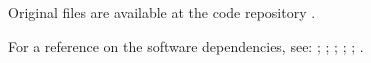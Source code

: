 
Original files are available at
the code repository \parencite{OwnJupyterRepo}.

For a reference on the software dependencies, see:
\cite{comp:scipy};
\cite{comp:sympy};
\cite{comp:jupyter};
\cite{comp:matplotlib};
\cite{comp:numpy};
\cite{comp:jupytext}.

